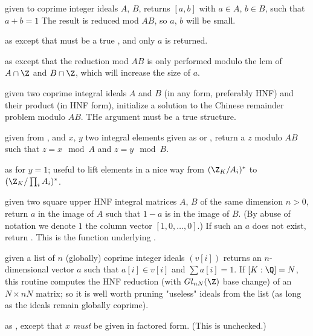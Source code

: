 
 given to coprime integer ideals
$A$, $B$, returns $[a,b]$ with $a\in A$, $b\in B$, such that $a + b = 1$
The result is reduced mod $AB$, so $a$, $b$ will be small.

 as  except
that  must be a true , and only $a$ is returned.

 as 
except that the reduction mod $AB$ is only performed modulo the lcm
of $A \cap \Z$ and $B\cap \Z$, which will increase the size of $a$.

 given two coprime
integral ideals $A$ and $B$ (in any form, preferably HNF) and
their product  (in HNF form), initialize a solution to the Chinese
remainder problem modulo $AB$. THe  argument must be a true 
structure.

 given  from
, and $x$, $y$ two integral elements given as 
or , return a $z$ modulo $AB$ such that
$z = x \mod A$ and $z = y \mod B$.

 as  for $y = 1$; useful
to lift elements in a nice way from $(\Z_K/A_i)^*$ to $(\Z_K/\prod_i A_i)^*$.

 given two square upper HNF integral
matrices $A$, $B$ of the same dimension $n > 0$, return $a$ in the image of
$A$ such that $1-a$ is in the image of $B$. (By abuse of notation we denote
$1$ the column vector $[1,0,\dots,0]$.) If such an $a$ does not exist, return
. This is the function underlying .

 given a list of $n$ (globally)
coprime integer ideals $(v[i])$ returns an $n$-dimensional vector $a$ such that
$a[i]\in v[i]$ and $\sum a[i] = 1$. If $[K:\Q] = N$, this routine computes
the HNF reduction (with $Gl_{nN}(\Z)$ base change) of an $N\times nN$ matrix;
so it is well worth pruning "useless" ideals from the list (as long as the
ideals remain globally coprime).

 as , except that
$x$ \emph{must} be given in factored form. (This is unchecked.)

